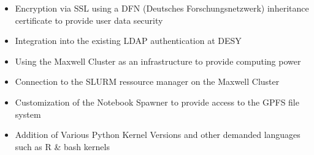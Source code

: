 \documentclass[10pt]{scrartcl}
\begin{document}
\begin{itemize}
 \item Encryption via SSL using a DFN (Deutsches Forschungsnetzwerk) inheritance certificate to provide user data security
 \item Integration into the existing LDAP authentication at DESY
 \item Using the Maxwell Cluster as an infrastructure to provide computing power
 \item Connection to the SLURM ressource manager on the Maxwell Cluster
 \item Customization of the Notebook Spawner to provide access to the GPFS file system
 \item Addition of Various Python Kernel Versions and other demanded languages such as R \& bash kernels
\end{itemize}
%
\end{document}
